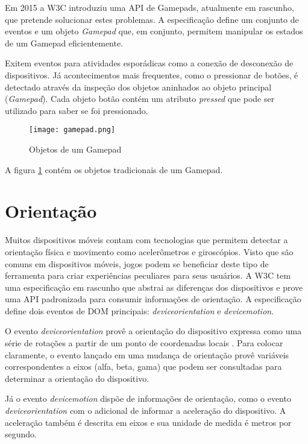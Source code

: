 Em 2015 a W3C introduziu uma API de Gamepads, atualmente em rascunho,
que pretende solucionar estes problemas. A especificação define um
conjunto de eventos e um objeto \textit{Gamepad} que, em conjunto,
permitem manipular os estados de um Gamepad eficientemente.

Exitem eventos para atividades esporádicas como a conexão de
desconexão de dispositivos. Já acontecimentos mais frequentes, como o
pressionar de botões, é detectado através da inspeção dos objetos
aninhados ao objeto principal (\textit{Gamepad}). Cada objeto botão contém um 
atributo \textit{pressed} que pode ser utilizado para saber se foi pressionado.

\begin{figure}[H]
    \centering
    \texttt{[image: gamepad.png]}
    \caption{Objetos de um Gamepad}
    \label{fig:gamepad}
\end{figure}

A figura \ref{fig:gamepad} contém os objetos tradicionais de um Gamepad.

\section{Orientação}
Muitos dispositivos móveis contam com tecnologias que permitem detectar
a orientação física e movimento como acelerômetros e giroscópios.
Visto que são comuns em dispositivos móveis, jogos podem se beneficiar
deste tipo de ferramenta para criar experiências peculiares para seus
usuários. A W3C tem uma especificação em rascunho que abstrai as
diferenças dos dispositivos e prove uma API padronizada para consumir
informações de orientação. A especificação define dois eventos de
DOM principais: \textit{deviceorientation} e \textit{devicemotion}.

O evento \textit{deviceorientation} provê a orientação do
dispositivo expressa como uma série de rotações a partir de um
ponto de coordenadas locais \autocite{orientationSpec}. Para colocar
claramente, o evento lançado em uma mudança de orientação provê
variáveis correspondentes a eixos (alfa, beta, gama) que podem ser
consultadas para determinar a orientação do dispositivo.

Já o evento \textit{devicemotion} dispõe de informações de
orientação, como o evento \textit{deviceorientation} com o adicional
de informar a aceleração do dispositivo. A aceleração também é descrita
em eixos e sua unidade de medida é metros por segundo.

